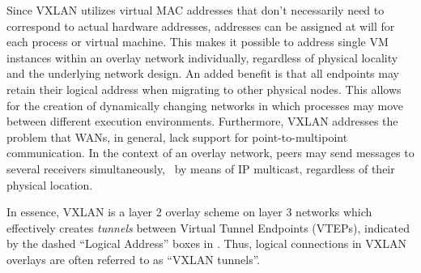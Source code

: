 Since VXLAN utilizes virtual MAC addresses that don't necessarily need to correspond to actual hardware addresses, addresses can be assigned at will for each process or virtual machine. This makes it possible to address single VM instances within an overlay network individually, regardless of physical locality and the underlying network design. An added benefit is that all endpoints may retain their logical address when migrating to other physical nodes. This allows for the creation of dynamically changing networks in which processes may move between different execution environments. Furthermore, VXLAN addresses the problem that WANs, in general, lack support for point-to-multipoint communication. In the context of an overlay network, peers may send messages to several receivers simultaneously, \eg\ by means of IP multicast, regardless of their physical location.

\pagebreak
In essence, VXLAN is a layer 2 overlay scheme on layer 3 networks which effectively creates \emph{tunnels} between Virtual Tunnel Endpoints (VTEPs), indicated by the dashed ``Logical Address'' boxes in . Thus, logical connections in VXLAN overlays are often referred to as ``VXLAN tunnels''.











